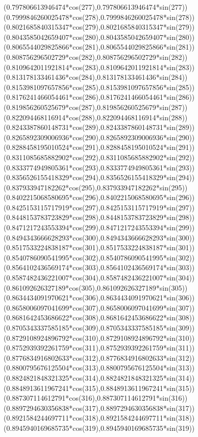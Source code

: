 {({0.797806613946474*cos(277)},{0.797806613946474*sin(277)})
({0.7999846260025478*cos(278)},{0.7999846260025478*sin(278)})
({0.8021685840315347*cos(279)},{0.8021685840315347*sin(279)})
({0.8043585042659407*cos(280)},{0.8043585042659407*sin(280)})
({0.8065544029825866*cos(281)},{0.8065544029825866*sin(281)})
({0.808756296502729*cos(282)},{0.808756296502729*sin(282)})
({0.8109642011921814*cos(283)},{0.8109642011921814*sin(283)})
({0.813178133461436*cos(284)},{0.813178133461436*sin(284)})
({0.8153981097657856*cos(285)},{0.8153981097657856*sin(285)})
({0.8176241466054461*cos(286)},{0.8176241466054461*sin(286)})
({0.819856260525679*cos(287)},{0.819856260525679*sin(287)})
({0.822094468116914*cos(288)},{0.822094468116914*sin(288)})
({0.8243387860148731*cos(289)},{0.8243387860148731*sin(289)})
({0.8265892309006936*cos(290)},{0.8265892309006936*sin(290)})
({0.8288458195010524*cos(291)},{0.8288458195010524*sin(291)})
({0.8311085685882902*cos(292)},{0.8311085685882902*sin(292)})
({0.8333774949805361*cos(293)},{0.8333774949805361*sin(293)})
({0.8356526155418329*cos(294)},{0.8356526155418329*sin(294)})
({0.837933947182262*cos(295)},{0.837933947182262*sin(295)})
({0.8402215068580695*cos(296)},{0.8402215068580695*sin(296)})
({0.8425153115717919*cos(297)},{0.8425153115717919*sin(297)})
({0.8448153783723829*cos(298)},{0.8448153783723829*sin(298)})
({0.8471217243553394*cos(299)},{0.8471217243553394*sin(299)})
({0.8494343666628293*cos(300)},{0.8494343666628293*sin(300)})
({0.8517533224838187*cos(301)},{0.8517533224838187*sin(301)})
({0.8540786090541995*cos(302)},{0.8540786090541995*sin(302)})
({0.8564102436569174*cos(303)},{0.8564102436569174*sin(303)})
({0.8587482436221007*cos(304)},{0.8587482436221007*sin(304)})
({0.861092626327189*cos(305)},{0.861092626327189*sin(305)})
({0.8634434091970621*cos(306)},{0.8634434091970621*sin(306)})
({0.8658006097041699*cos(307)},{0.8658006097041699*sin(307)})
({0.8681642453686622*cos(308)},{0.8681642453686622*sin(308)})
({0.8705343337585185*cos(309)},{0.8705343337585185*sin(309)})
({0.8729108924896792*cos(310)},{0.8729108924896792*sin(310)})
({0.8752939392261759*cos(311)},{0.8752939392261759*sin(311)})
({0.8776834916802633*cos(312)},{0.8776834916802633*sin(312)})
({0.8800795676125504*cos(313)},{0.8800795676125504*sin(313)})
({0.8824821848321325*cos(314)},{0.8824821848321325*sin(314)})
({0.8848913611967241*cos(315)},{0.8848913611967241*sin(315)})
({0.887307114612791*cos(316)},{0.887307114612791*sin(316)})
({0.8897294630356838*cos(317)},{0.8897294630356838*sin(317)})
({0.8921584244697711*cos(318)},{0.8921584244697711*sin(318)})
({0.8945940169685735*cos(319)},{0.8945940169685735*sin(319)})
}
